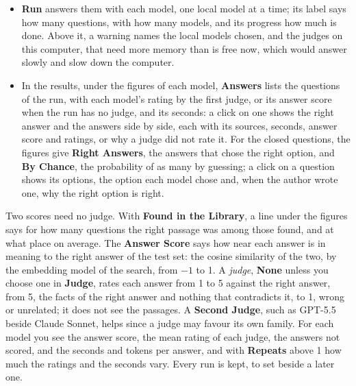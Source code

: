 \documentclass[10pt,a4paper,twoside]{article}
\newcommand{\ui}[1]{\textbf{#1}}
\begin{document}
\begin{itemize}
    the Panel FAQ, with no search, which tests the answer alone (open book answering). \ui{None}: each model is given
    no passage and answers from what it learned in training alone (closed book answering), which shows the questions a
    model answers without the documents. With \ui{Found in the Library}, \ui{Search In} chooses where the strategy
    finds them, as in Ask Pollis: \ui{Auto}, any of the sources ticked, the Package APIs, the Articles, the Knowledge
    Base and your collections among them, or \ui{All Sources}. The line of a run says what it chose. \ui{Repeats} asks each question
    more than once, to show how much the answers vary.
  \item \ui{Run} answers them with each model, one local model at a time; its label says how many questions,
    with how many models, and its progress how much is done. Above it, a warning names the local models chosen, and the
    judges on this computer, that need more memory than is free now, which would answer slowly and slow down the computer.
  \item In the results, under the figures of each model, \ui{Answers} lists the questions of the run, with each model's rating by the first judge, or its
    answer score when the run has no judge, and its seconds: a click on one shows the right answer and the answers
    side by side, each with its sources, seconds, answer score and ratings, or why a judge did not rate it. For the closed questions, the figures give \ui{Right Answers}, the answers that chose
    the right option, and \ui{By Chance}, the probability of as many by guessing; a click on a question shows its
    options, the option each model chose and, when the author wrote one, why the right option is right.
\end{itemize}
Two scores need no judge. With \ui{Found in the Library}, a line under the figures says for how many questions the
right passage was among those found, and at what place on average. The \ui{Answer Score} says how near each answer is
in meaning to the right answer of the test set: the cosine similarity of the two, by the embedding model of the
search, from $-1$ to 1. A \emph{judge}, \ui{None} unless you choose one in \ui{Judge}, rates each answer from 1 to 5
against the right answer, from 5, the facts of the right answer and nothing that contradicts it, to 1, wrong or
unrelated; it does not see the passages. A \ui{Second Judge}, such as GPT-5.5 beside Claude Sonnet, helps since a
judge may favour its own family. For each model you see the answer score, the mean rating of each judge, the answers
not scored, and the seconds and tokens per answer, and with \ui{Repeats} above 1 how much the ratings and the seconds
vary. Every run is kept, to set beside a later one.
\end{document}
